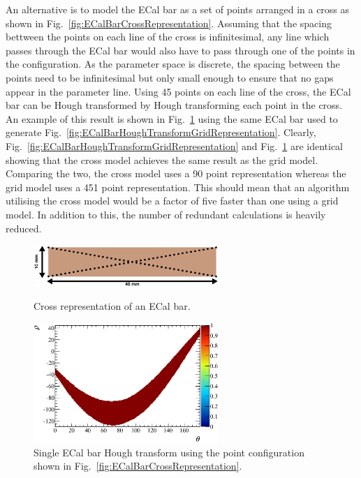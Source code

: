 An alternative is to model the ECal bar as a set of points arranged in a cross as shown in Fig.~\ref{fig:ECalBarCrossRepresentation}.  Assuming that the spacing bettween the points on each line of the cross is infinitesimal, any line which passes through the ECal bar would also have to pass through one of the points in the configuration.  As the parameter space is discrete, the spacing between the points need to be infinitesimal but only small enough to ensure that no gaps appear in the parameter line.  Using 45 points on each line of the cross, the ECal bar can be Hough transformed by Hough transforming each point in the cross. An example of this result is shown in Fig.~\ref{fig:ECalBarHoughTransformCrossRepresentation} using the same ECal bar used to generate Fig.~\ref{fig:ECalBarHoughTransformGridRepresentation}.  Clearly, Fig.~\ref{fig:ECalBarHoughTransformGridRepresentation} and Fig.~\ref{fig:ECalBarHoughTransformCrossRepresentation} are identical showing that the cross model achieves the same result as the grid model.  Comparing the two, the cross model uses a 90 point representation whereas the grid model uses a 451 point representation.  This should mean that an algorithm utilising the cross model would be a factor of five faster than one using a grid model.  In addition to this, the number of redundant calculations is heavily reduced.
\begin{figure}
  \centering
  \parbox{7cm}{
    \includegraphics[width=7cm]{images/ecal_hough_transform/ecal_cross_array.eps}
    \caption{Cross representation of an ECal bar.}
    \label{fig:ECalBarCrossRepresentation}}
    \qquad
    \begin{minipage}{7cm}
      \includegraphics[width=7cm]{images/ecal_hough_transform/single_ecal_bar_hough_transform.eps}
      \caption{Single ECal bar Hough transform using the point configuration shown in Fig.~\ref{fig:ECalBarCrossRepresentation}.}
      \label{fig:ECalBarHoughTransformCrossRepresentation}
    \end{minipage}
\end{figure}

